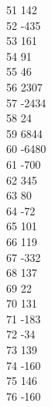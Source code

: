 { 51	142 \\
 52	-435 \\
 53	161 \\
 54	91 \\
 55	46 \\
 56	2307 \\
 57	-2434 \\
 58	24 \\
 59	6844 \\
 60	-6480 \\
 61	-700 \\
 62	345 \\
 63	80 \\
 64	-72 \\
 65	101 \\
 66	119 \\
 67	-332 \\
 68	137 \\
 69	22 \\
 70	131 \\
 71	-183 \\
 72	-34 \\
 73	139 \\
 74	-160 \\
 75	146 \\
 76	-160 \\
}
